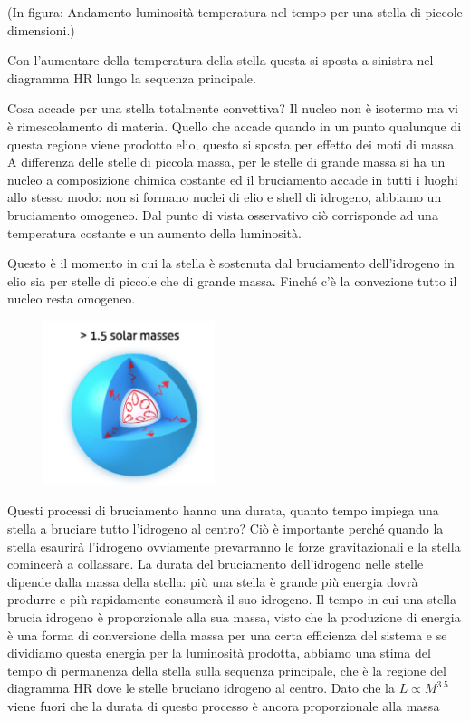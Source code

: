 (In figura: Andamento luminosità-temperatura nel tempo per una stella di piccole dimensioni.)

Con l'aumentare della temperatura della stella questa si sposta a sinistra nel diagramma HR lungo la sequenza principale.

\vspace{0.2cm}Cosa accade per una stella totalmente convettiva? Il nucleo non è isotermo ma vi è rimescolamento di materia. Quello che accade quando in un punto qualunque di questa regione viene prodotto elio, questo si sposta per effetto dei moti di massa. A differenza delle stelle di piccola massa, per le stelle di grande massa si ha un nucleo a composizione chimica costante ed il bruciamento accade in tutti i luoghi allo stesso modo: non si formano nuclei di elio e shell di idrogeno, abbiamo un bruciamento omogeneo. Dal punto di vista osservativo ciò corrisponde ad una temperatura costante e un aumento della luminosità.

Questo è il momento in cui la stella è sostenuta dal bruciamento dell'idrogeno in elio sia per stelle di piccole che di grande massa. Finché c'è la convezione tutto il nucleo resta omogeneo. 

\begin{figure}[H]
    \centering
    \includegraphics[width=5cm]{Illustrazione di una stella dal nucleo convettivo.png}
    \label{fig:Illustrazione di una stella dal nucleo convettivo.png}
\end{figure}

Questi processi di bruciamento hanno una durata, quanto tempo impiega una stella a bruciare tutto l'idrogeno al centro? Ciò è importante perché quando la stella esaurirà l'idrogeno ovviamente prevarranno le forze gravitazionali e la stella comincerà a collassare. La durata del bruciamento dell'idrogeno nelle stelle dipende dalla massa della stella: più una stella è grande più energia dovrà produrre e più rapidamente consumerà il suo idrogeno. Il tempo in cui una stella brucia idrogeno è proporzionale alla sua massa, visto che la produzione di energia è una forma di conversione della massa per una certa efficienza del sistema e se dividiamo questa energia per la luminosità prodotta, abbiamo una stima del tempo di permanenza della stella sulla sequenza principale, che è la regione del diagramma HR dove le stelle bruciano idrogeno al centro. Dato che la $L \propto M^{3.5}$ viene fuori che la durata di questo processo è ancora proporzionale alla massa

